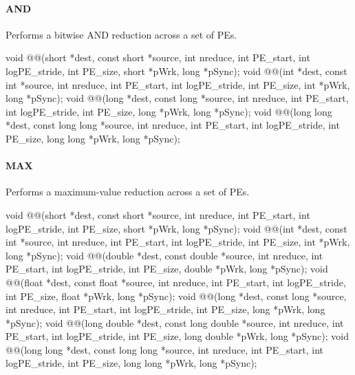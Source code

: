 
\begin{apidefinition}

\paragraph{AND}
Performs a bitwise AND reduction across a set of \acp{PE}.\newline
\begin{Csynopsis}
void @@(short *dest, const short *source, int nreduce, int PE_start, int logPE_stride, int PE_size, short *pWrk, long *pSync);
void @@(int *dest, const int *source, int nreduce, int PE_start, int logPE_stride, int PE_size, int *pWrk, long *pSync);
void @@(long *dest, const long *source, int nreduce, int PE_start, int logPE_stride, int PE_size, long *pWrk, long *pSync);
void @@(long long *dest, const long long *source, int nreduce, int PE_start, int logPE_stride, int PE_size, long long *pWrk, long *pSync);
\end{Csynopsis}

\paragraph{MAX}
Performs a maximum-value reduction across a set of \acp{PE}.\newline
\begin{Csynopsis}
void @@(short *dest, const short *source, int nreduce, int PE_start, int logPE_stride, int PE_size, short *pWrk, long *pSync);
void @@(int *dest, const int *source, int nreduce, int PE_start, int logPE_stride, int PE_size, int *pWrk, long *pSync);
void @@(double *dest, const double *source, int nreduce, int PE_start, int logPE_stride, int PE_size, double *pWrk, long *pSync);
void @@(float *dest, const float *source, int nreduce, int PE_start, int logPE_stride, int PE_size, float *pWrk, long *pSync);
void @@(long *dest, const long *source, int nreduce, int PE_start, int logPE_stride, int PE_size, long *pWrk, long *pSync);
void @@(long double *dest, const long double *source, int nreduce, int PE_start, int logPE_stride, int PE_size, long double *pWrk, long *pSync);
void @@(long long *dest, const long long *source, int nreduce, int PE_start, int logPE_stride, int PE_size, long long *pWrk, long *pSync);
\end{Csynopsis}


\end{apidefinition}
